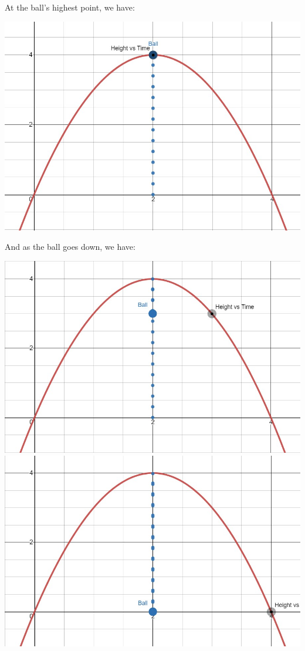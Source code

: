 \documentclass[nooutcomes]{ximera}
\begin{document}
\begin{example}
\begin{explanation}
At the ball's highest point, we have:
\begin{image}
\includegraphics{Zeros-BouncingBall4}
\end{image}

And as the ball goes down, we have:
\begin{image}
\includegraphics{Zeros-BouncingBall5}
\includegraphics{Zeros-BouncingBall6}
\end{image}


\end{explanation}
\end{example}
\end{document}

